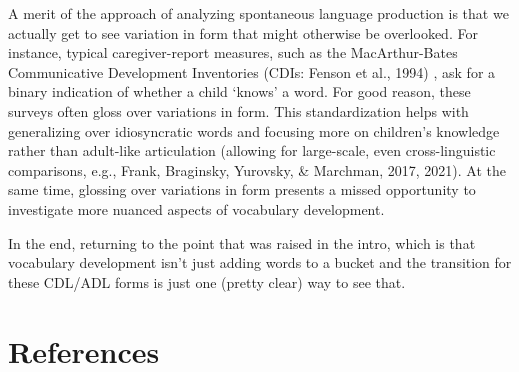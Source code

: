 \documentclass[10pt, letterpaper]{article}
\begin{document}
A merit of the approach of analyzing spontaneous language production is
that we actually get to see variation in form that might otherwise be
overlooked. For instance, typical caregiver-report measures, such as the
MacArthur-Bates Communicative Development Inventories (CDIs: Fenson et
al., 1994) , ask for a binary indication of whether a child `knows' a
word. For good reason, these surveys often gloss over variations in
form. This standardization helps with generalizing over idiosyncratic
words and focusing more on children's knowledge rather than adult-like
articulation (allowing for large-scale, even cross-linguistic
comparisons, e.g., Frank, Braginsky, Yurovsky, \& Marchman, 2017, 2021).
At the same time, glossing over variations in form presents a missed
opportunity to investigate more nuanced aspects of vocabulary
development.

In the end, returning to the point that was raised in the intro, which
is that vocabulary development isn't just adding words to a bucket and
the transition for these CDL/ADL forms is just one (pretty clear) way to
see that.

\hypertarget{references}{%
\section{References}\label{references}}

\setlength{\parindent}{-0.1in} 
\setlength{\leftskip}{0.125in}

\noindent
\end{document}
